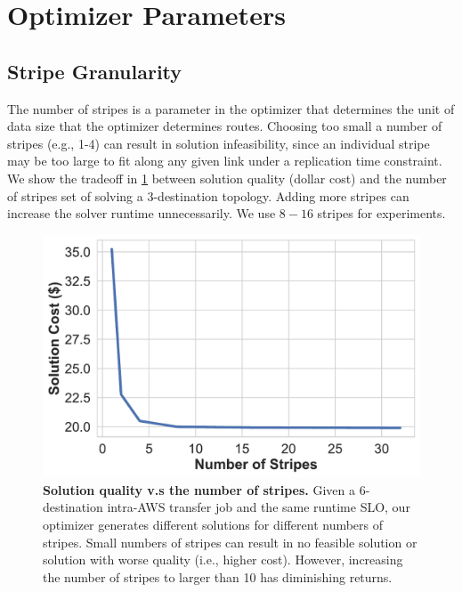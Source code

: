 \section{Optimizer Parameters}

\subsection{Stripe Granularity}
The number of stripes is a parameter in the optimizer that determines the unit of data size that the optimizer determines routes. Choosing too small a number of stripes (e.g., 1-4) can result in solution infeasibility, since an individual stripe may be too large to fit along any given link under a replication time constraint.
We show the tradeoff in \ref{fig:stripe-quality} between solution quality (dollar cost) and the number of stripes set of solving a 3-destination topology. Adding more stripes can increase the solver runtime unnecessarily. We use $8-16$ stripes for experiments. 

\begin{figure}[ht]
    \centering
    \includegraphics[width=.85\linewidth]{figures/num_stripes_quality.pdf}
    
    \caption{\textbf{Solution quality v.s the number of stripes.} Given a 6-destination intra-AWS transfer job and the same runtime SLO, our optimizer generates different solutions for different numbers of stripes. Small numbers of stripes can result in no feasible solution or solution with worse quality (i.e., higher cost). However, increasing the number of stripes to larger than 10 has diminishing returns.}  
    
    \label{fig:stripe-quality}
\end{figure} 

